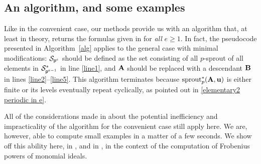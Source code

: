 \documentclass{amsart}
\begin{document}
\newpage
\subsection{An algorithm, and some examples}
\label{algorithm and examples: SS}

Like in the convenient case, our methods provide us with an algorithm that, at least in theory, returns the formulas given in  for \emph{all} $e \ge 1$.
In fact, the pseudocode presented in Algorithm~\ref{alg} applies to the general case with minimal modifications:
$\mathcal{S}_{\mathsf{p}^e}$ should be defined as the set consisting of all $p$-sprout of all elements in $\mathcal{S}^*_{\mathsf{p}^{e-1}}$ in line \ref{line1}, and $\mathbf{A}$ should be replaced with a descendant $\mathbf{B}$ in lines \ref{line2}--\ref{line5}.
This algorithm terminates because $\operatorname{sprout}^*_p(\mathbf{A},\mathbf{u})$ is either finite or its levels eventually repeat cyclically, as pointed out in \eqref{elementary2 periodic in e}.

All of the considerations made in  about the potential inefficiency and impracticality of the algorithm for the convenient case still apply here.
We are, however, able to compute small examples in a matter of a few seconds.
We show off this ability here, in , and in ,
in the context of the computation of Frobenius powers of monomial ideals.
\end{document}
